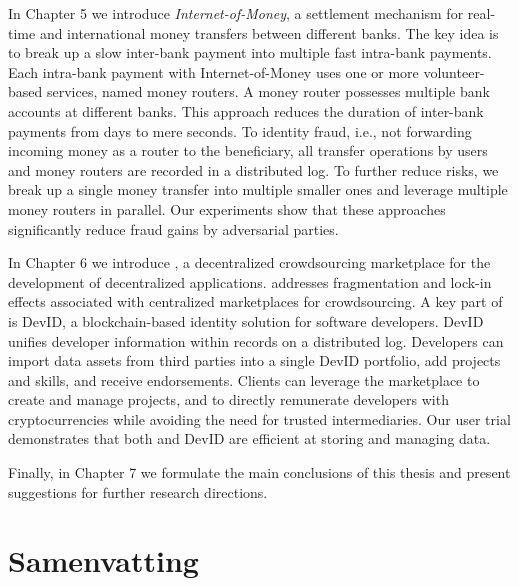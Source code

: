 In Chapter 5 we introduce \emph{Internet-of-Money}, a settlement mechanism for real-time and international money transfers between different banks.
The key idea is to break up a slow inter-bank payment into multiple fast intra-bank payments.
Each intra-bank payment with Internet-of-Money uses one or more volunteer-based services, named money routers.
A money router possesses multiple bank accounts at different banks.
This approach reduces the duration of inter-bank payments from days to mere seconds.
To identity fraud, i.e., not forwarding incoming money as a router to the beneficiary, all transfer operations by users and money routers are recorded in a distributed log.
To further reduce risks, we break up a single money transfer into multiple smaller ones and leverage multiple money routers in parallel.
Our experiments show that these approaches significantly reduce fraud gains by adversarial parties.

In Chapter 6 we introduce \emph{\Dappcoder{}}, a decentralized crowdsourcing marketplace for the development of decentralized applications.
\Dappcoder{} addresses fragmentation and lock-in effects associated with centralized marketplaces for crowdsourcing.
A key part of \Dappcoder{} is DevID, a blockchain-based identity solution for software developers.
DevID unifies developer information within records on a distributed log.
Developers can import data assets from third parties into a single DevID portfolio, add projects and skills, and receive endorsements.
Clients can leverage the \Dappcoder{} marketplace to create and manage projects, and to directly remunerate developers with cryptocurrencies while avoiding the need for trusted intermediaries.
Our user trial demonstrates that both \Dappcoder{} and DevID are efficient at storing and managing data.

Finally, in Chapter 7 we formulate the main conclusions of this thesis and present suggestions for further research directions.

\chapter*{Samenvatting}

